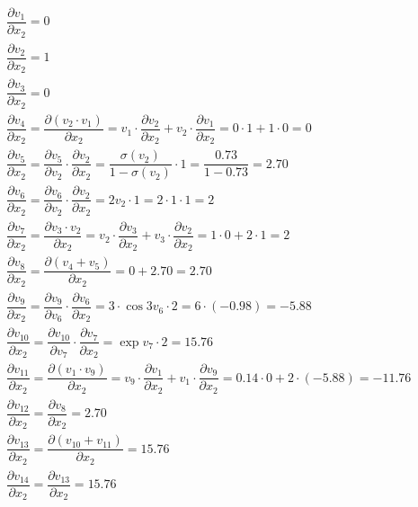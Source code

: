\documentclass[12pt]{article}
\begin{document}
\begin{enumerate}[label=(\roman*)]
    




\begin{fleqn}
    \begin{gather*}
        \dfrac{\partial v_{1}}{\partial x_{2}} =  0 \\
        \dfrac{\partial v_{2}}{\partial x_{2}} =  1  \\
        \dfrac{\partial v_{3}}{\partial x_{2}} = 0  \\
        \dfrac{\partial v_{4}}{\partial x_{2}} = \dfrac{\partial (v_{2}\cdot v_1)}{\partial x_{2}} = v_1\cdot\dfrac{\partial v_{2}}{\partial x_{2}} + v_2\cdot\dfrac{\partial v_{1}}{\partial x_{2}} = 0\cdot 1 + 1\cdot 0 = 0   \\
        \dfrac{\partial v_{5}}{\partial x_{2}} = \dfrac{\partial v_{5}}{\partial v_{2}}\cdot \dfrac{\partial v_{2}}{\partial x_{2}} =  \dfrac{\sigma(v_2)}{1-\sigma(v_2)} \cdot 1 = \dfrac{0.73}{1-0.73} = 2.70  \\ 
        \dfrac{\partial v_{6}}{\partial x_{2}} = \dfrac{\partial v_{6}}{\partial v_{2}} \cdot \dfrac{\partial v_{2}}{\partial x_{2}} = 2 v_2 \cdot 1 = 2 \cdot 1 \cdot 1 = 2 \\
        \dfrac{\partial v_{7}}{\partial x_{2}} = \dfrac{\partial v_{3}\cdot v_2}{\partial x_{2}} = v_2 \cdot \dfrac{\partial v_{3}}{\partial x_{2}} + v_3 \cdot \dfrac{\partial v_{2}}{\partial x_{2}} = 1 \cdot 0 + 2 \cdot 1 = 2 \\ 
        \dfrac{\partial v_{8}}{\partial x_{2}} = \dfrac{\partial (v_{4} + v_5)}{\partial x_{2}} = 0 + 2.70 = 2.70  \\
        \dfrac{\partial v_{9}}{\partial x_{2}} = \dfrac{\partial v_{9}}{\partial v_{6}} \cdot \dfrac{\partial v_{6}}{\partial x_{2}} = 3 \cdot \cos{3v_6} \cdot 2 =  6 \cdot (-0.98) = -5.88  \\
        \dfrac{\partial v_{10}}{\partial x_{2}} = \dfrac{\partial v_{10}}{\partial v_{7}} \cdot \dfrac{\partial v_{7}}{\partial x_{2}}  = \exp{v_7} \cdot 2 = 15.76  \\
        \dfrac{\partial v_{11}}{\partial x_{2}} = \dfrac{\partial (v_{1}\cdot v_9)}{\partial x_{2}} = v_9\cdot\dfrac{\partial v_{1}}{\partial x_{2}} + v_1\cdot\dfrac{\partial v_{9}}{\partial x_{2}} = 0.14 \cdot 0 + 2\cdot (-5.88) = -11.76  \\
        \dfrac{\partial v_{12}}{\partial x_{2}} = \dfrac{\partial v_{8}}{\partial x_{2}} = 2.70  \\
        \dfrac{\partial v_{13}}{\partial x_{2}} = \dfrac{\partial (v_{10} + v_11)}{\partial x_{2}} = 15.76  \\
        \dfrac{\partial v_{14}}{\partial x_{2}} = \dfrac{\partial v_{13}}{\partial x_{2}}  = 15.76 \\
    \end{gather*}
\end{fleqn}


\end{enumerate}
\end{document}
